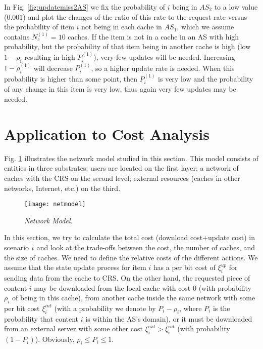 \documentclass[conference]{IEEEtran}
\theoremstyle{plain}
\theoremstyle{remark}
\begin{document}
In Fig. \ref{fig:updatemiss2AS} we fix the probability of $i$ being in $AS_2$ to a low value ($0.001$) and plot the changes of the ratio of this rate to the request rate versus the probability of item $i$ not being in each cache in $AS_1$, which we assume contains $N^{(1)}_c=10$ caches.
If the item is not in a cache in an AS with high probability, but the probability of that item being in another cache is high  (low $1-\rho_i$ resulting in high $P^{(1)}_i$), very few updates will be needed. Increasing $1-\rho^{(1)}_i$ will decrease $P^{(1)}_i$, so a higher update rate is needed. When this probability is higher than some point, then $P^{(1)}_i$ is very low and the probability of any change in this item is very low, thus again very few updates may be needed.

\section{Application to Cost Analysis}
\label{sec:costanalysis}



Fig. \ref{fig:netmodel} illustrates the network model studied in this section. This model consists of entities in three substrates: users are located on the first layer; a network of caches with the CRS on the second level; external resources (caches in other networks, Internet, etc.) on the third.

\begin{figure}[http]
    \center
      \texttt{[image: netmodel]}\\
      \caption{\textit{Network Model.}}
    \label{fig:netmodel}
\end{figure}

In this section, we try to calculate the total cost (download cost+update cost) in scenario $\romannumeral 1$ and look at the trade-offs between the cost, the number of caches, and the size of caches. We need to define the relative costs of the different actions. We assume that the state update process for item $i$ has a per bit cost of $\xi^{up}_i$ for sending data from the cache to CRS. On the other hand, the requested piece of content $i$ may be downloaded from the local cache with cost 0 (with probability $\rho_i$ of being in this cache), from another cache inside the same network with some per bit cost $\xi^{int}_i$ (with a probability we denote by $P_i - \rho_i$, where $P_i$ is the probability that content $i$ is within the AS's domain), or it must be downloaded from an external server with some other cost $\xi^{ext}_i>\xi^{int}_i$ (with probability $(1-P_i)$). Obviously, $\rho_i \leq P_i \leq 1$. 
\end{document}
